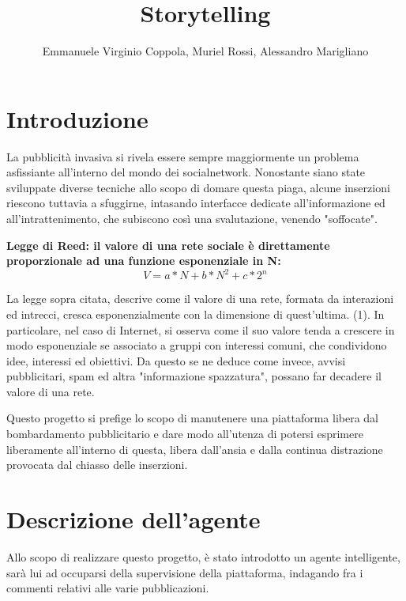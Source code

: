 \documentclass{article} %
\title{Storytelling} %
\author{Emmanuele Virginio Coppola, Muriel Rossi, Alessandro Marigliano} %
\begin{document}
    \maketitle %

    
    \section{Introduzione} %
    
    La pubblicità invasiva si rivela essere sempre maggiormente un problema asfissiante all'interno del mondo dei socialnetwork. Nonostante siano state sviluppate diverse tecniche
    allo scopo di domare questa piaga, alcune inserzioni riescono tuttavia a sfuggirne, intasando interfacce dedicate all'informazione ed 
    all'intrattenimento, che subiscono così una svalutazione, venendo "soffocate".
    

    \textbf{Legge di Reed: il valore di una rete sociale è direttamente proporzionale ad una funzione esponenziale in N:}
    \begin{equation} %
        V=a*N+b*N^2 + c*2^n
        \end{equation}
    

    La legge sopra citata, descrive come il valore di una rete, formata da interazioni ed intrecci, cresca esponenzialmente con la dimensione di quest'ultima. (1).
    In particolare, nel caso di Internet, si osserva come il suo valore tenda a crescere in modo esponenziale se associato a gruppi con interessi
     comuni, che condividono idee, interessi ed obiettivi.
    Da questo se ne deduce come invece, avvisi pubblicitari, spam ed altra "informazione spazzatura", possano far decadere il valore di una rete.
    
    Questo progetto si prefige lo scopo di manutenere una piattaforma libera dal bombardamento pubblicitario e dare modo all'utenza di potersi esprimere liberamente
    all'interno di questa, libera dall'ansia e dalla continua distrazione provocata dal chiasso delle inserzioni.
    \section{Descrizione dell'agente}
    Allo scopo di realizzare questo progetto, è stato introdotto un agente intelligente, sarà lui ad occuparsi della supervisione della piattaforma, indagando fra i 
    commenti relativi alle varie pubblicazioni.
\end{document}

